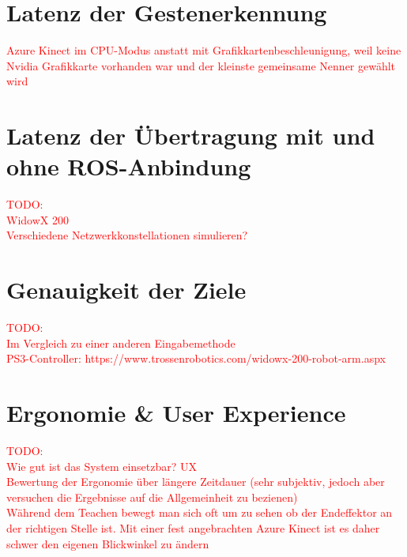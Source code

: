 
\section{Latenz der Gestenerkennung}
\textcolor{red}{Azure Kinect im CPU-Modus anstatt mit Grafikkartenbeschleunigung, weil keine Nvidia Grafikkarte vorhanden war und der kleinste gemeinsame Nenner gewählt wird}

\section{Latenz der Übertragung mit und ohne ROS-Anbindung}
\textcolor{red}{TODO:\\
WidowX 200\\
Verschiedene Netzwerkkonstellationen simulieren? %
}

\section{Genauigkeit der Ziele}
\textcolor{red}{TODO:\\
Im Vergleich zu einer anderen Eingabemethode\\
PS3-Controller: https://www.trossenrobotics.com/widowx-200-robot-arm.aspx
}

\section{Ergonomie \& User Experience}
\textcolor{red}{TODO:\\
Wie gut ist das System einsetzbar? UX\\
Bewertung der Ergonomie über längere Zeitdauer (sehr subjektiv, jedoch aber versuchen die Ergebnisse auf die Allgemeinheit zu bezienen)\\
Während dem Teachen bewegt man sich oft um zu sehen ob der Endeffektor an der richtigen Stelle ist. Mit einer fest angebrachten Azure Kinect ist es daher schwer den eigenen Blickwinkel zu ändern
}
